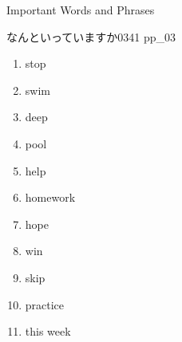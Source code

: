 \documentclass[aspectratio=169,xcolor={dvipsnames,table}]{beamer}
\begin{document}
\begin{frame}[plain]{Important Words and Phrases}

  なんといっていますか\hfill{\tiny 0341}\,{\scriptsize {}\,pp\_03}\pause

  \vspace{-10pt}
  \Large
  \begin{enumerate}[<+- |alert@+>]\setlength{\itemsep}{-1.8pt}
    \item stop
    \item swim
    \item deep
    \item pool
    \item help
    \item homework
    \item hope
    \item win
    \item skip
    \item practice
    \item this week
  \end{enumerate}

\end{frame}
\end{document}
